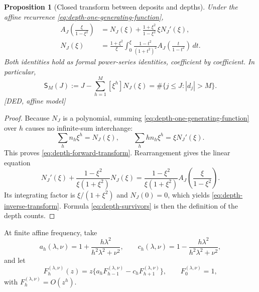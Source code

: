 \documentclass[11pt]{amsart}
\numberwithin{equation}{section}
\theoremstyle{plain}
\newtheorem{proposition}[theorem]{Proposition}
\theoremstyle{definition}
\theoremstyle{remark}
\begin{document}
\begin{proposition}[Closed transform between deposits and depths]
\label{prop:closed-depth-transform}
Under the affine recurrence \eqref{eq:depth-one-generating-function},
\begin{align}
 A_J\!\left(\frac{\xi}{1-\xi^2}\right)
 &=N_J(\xi)+\frac{1+\xi^2}{1-\xi^2}\,\xi N_J'(\xi),
\label{eq:depth-forward-transform}\\
 N_J(\xi)
 &=\frac{1+\xi^2}{\xi}\int_0^\xi
 \frac{1-t^2}{(1+t^2)^2}
 A_J\!\left(\frac{t}{1-t^2}\right)\,dt.
\label{eq:depth-inverse-transform}
\end{align}
Both identities hold as formal power-series identities, coefficient by
coefficient.  In particular,
\begin{equation}
 \mathsf S_M(J):=J-\sum_{h=1}^M[\xi^h]N_J(\xi)
 =\#\{j\le J:|d_j|>M\}.
\label{eq:depth-survivors}
\end{equation}
\textup{[DED, affine model]}
\end{proposition}

\begin{proof}
Because $N_J$ is a polynomial, summing \eqref{eq:depth-one-generating-function}
over $h$ causes no infinite-sum interchange:
\begin{equation}
 \sum_hn_h\xi^h=N_J(\xi),\qquad
 \sum_hh n_h\xi^h=\xi N_J'(\xi).
\end{equation}
This proves \eqref{eq:depth-forward-transform}.  Rearrangement gives the
linear equation
\begin{equation}
 N_J'(\xi)+\frac{1-\xi^2}{\xi(1+\xi^2)}N_J(\xi)
 =\frac{1-\xi^2}{\xi(1+\xi^2)}
 A_J\!\left(\frac{\xi}{1-\xi^2}\right).
\end{equation}
Its integrating factor is $\xi/(1+\xi^2)$ and $N_J(0)=0$, which yields
\eqref{eq:depth-inverse-transform}.  Formula \eqref{eq:depth-survivors} is
then the definition of the depth counts.
\end{proof}

At finite affine frequency, take
\begin{equation}
 a_h(\lambda,\nu)=1+\frac{h\lambda^2}{h^2\lambda^2+\nu^2},
 \qquad
 c_h(\lambda,\nu)=1-\frac{h\lambda^2}{h^2\lambda^2+\nu^2},
\label{eq:finite-affine-weights}
\end{equation}
and let
\begin{equation}
 F_h^{(\lambda,\nu)}(z)
 =z\{a_hF_{h-1}^{(\lambda,\nu)}-c_hF_{h+1}^{(\lambda,\nu)}\},
 \qquad F_0^{(\lambda,\nu)}=1,
\label{eq:finite-affine-recurrence}
\end{equation}
with $F_h^{(\lambda,\nu)}=O(z^h)$.
\end{document}

